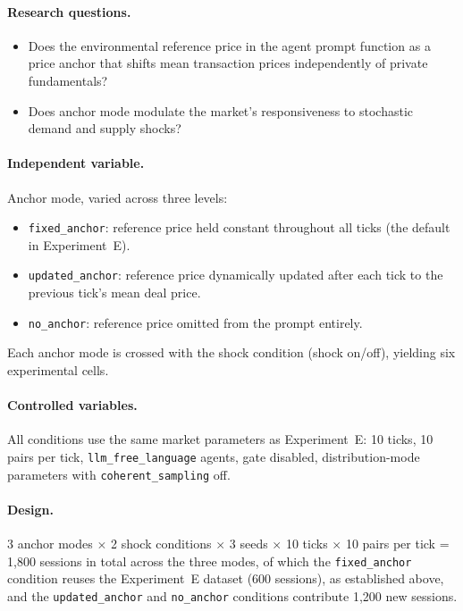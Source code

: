 \paragraph{Research questions.}
\begin{itemize}
    \item[\textbf{RQ-J1.}] Does the environmental reference price in the agent prompt function as a price anchor that shifts mean transaction prices independently of private fundamentals?
    \item[\textbf{RQ-J2.}] Does anchor mode modulate the market's responsiveness to stochastic demand and supply shocks?
\end{itemize}

\paragraph{Independent variable.}
Anchor mode, varied across three levels:
\begin{itemize}
    \item \texttt{fixed\_anchor}: reference price held constant throughout all ticks (the default in Experiment~E).
    \item \texttt{updated\_anchor}: reference price dynamically updated after each tick to the previous tick's mean deal price.
    \item \texttt{no\_anchor}: reference price omitted from the prompt entirely.
\end{itemize}
Each anchor mode is crossed with the shock condition (shock on/off), yielding six experimental cells.

\paragraph{Controlled variables.}
All conditions use the same market parameters as Experiment~E: 10 ticks, 10 pairs per tick, \texttt{llm\_free\_language} agents, gate disabled, distribution-mode parameters with \texttt{coherent\_sampling} off.

\paragraph{Design.}
3 anchor modes $\times$ 2 shock conditions $\times$ 3 seeds $\times$ 10 ticks $\times$ 10 pairs per tick = 1{,}800 sessions in total across the three modes, of which the \texttt{fixed\_anchor} condition reuses the Experiment~E dataset (600 sessions), as established above, and the \texttt{updated\_anchor} and \texttt{no\_anchor} conditions contribute 1{,}200 new sessions.

